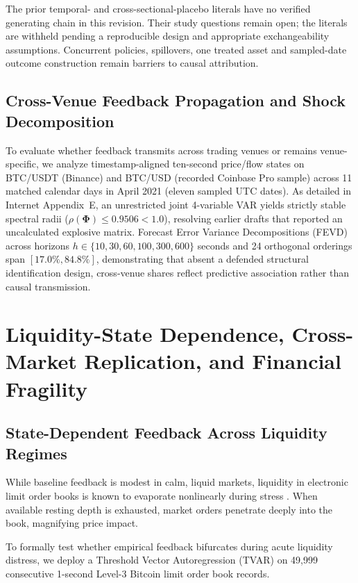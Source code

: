 \documentclass[12pt]{article}
\theoremstyle{definition}
\theoremstyle{remark}
\begin{document}
The prior temporal- and cross-sectional-placebo literals have no verified generating chain in this revision. Their study questions remain open; the literals are withheld pending a reproducible design and appropriate exchangeability assumptions. Concurrent policies, spillovers, one treated asset and sampled-date outcome construction remain barriers to causal attribution.

\subsection{Cross-Venue Feedback Propagation and Shock Decomposition}
To evaluate whether feedback transmits across trading venues or remains venue-specific, we analyze timestamp-aligned ten-second price/flow states on BTC/USDT (Binance) and BTC/USD (recorded Coinbase Pro sample) across 11 matched calendar days in April 2021 (eleven sampled UTC dates). As detailed in Internet Appendix~E, an unrestricted joint 4-variable VAR yields strictly stable spectral radii ($\rho(\mathbf{\Phi}) \le 0.9506 < 1.0$), resolving earlier drafts that reported an uncalculated explosive matrix. Forecast Error Variance Decompositions (FEVD) across horizons $h \in \{10,30,60,100,300,600\}$ seconds and 24 orthogonal orderings span $[17.0\%, 84.8\%]$, demonstrating that absent a defended structural identification design, cross-venue shares reflect predictive association rather than causal transmission.

\section{Liquidity-State Dependence, Cross-Market Replication, and Financial Fragility}
\label{sec:stress_fragility}

\subsection{State-Dependent Feedback Across Liquidity Regimes}
While baseline feedback is modest in calm, liquid markets, liquidity in electronic limit order books is known to evaporate nonlinearly during stress \citep{brunnermeier2009,almgren2000}. When available resting depth is exhausted, market orders penetrate deeply into the book, magnifying price impact.

To formally test whether empirical feedback bifurcates during acute liquidity distress, we deploy a Threshold Vector Autoregression (TVAR) on 49,999 consecutive 1-second Level-3 Bitcoin limit order book records.
\end{document}

